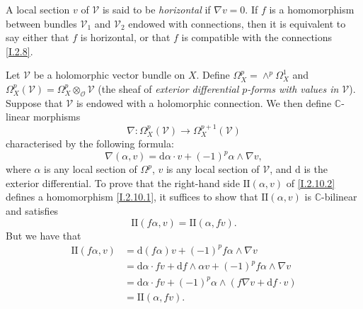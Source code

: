 \documentclass{report}
\theoremstyle{plain}
\theoremstyle{definition}
\newenvironment{env}[1]
    {\renewcommand\theinnercustomenv{#1}\innercustomenv}
    {\endinnercustomenv}
\newcommand{\sh}[1]{{\mathscr{#1}}}
\newcommand{\CC}{\mathbb{C}}
\newcommand{\dd}{\mathrm{d}}
\newcommand{\II}{\mathrm{II}}
\begin{document}
\begin{env}{2.9}
\label{I.2.9}
  A local section $v$ of $\sh{V}$ is said to be \emph{horizontal} if $\nabla v=0$.
  If $f$ is a homomorphism between bundles $\sh{V}_1$ and $\sh{V}_2$ endowed with connections, then it is equivalent to say either that $f$ is horizontal, or that $f$ is compatible with the connections \cref{I.2.8}.
\end{env}

\begin{env}{2.10}
\label{I.2.10}
  Let $\sh{V}$ be a holomorphic vector bundle on $X$.
  Define $\Omega_X^p=\wedge^p\Omega_X^1$ and $\Omega_X^p(\sh{V})=\Omega_X^p\otimes_\sh{O}\sh{V}$ (the sheaf of \emph{exterior differential $p$-forms with values in $\sh{V}$}).
  Suppose that $\sh{V}$ is endowed with a holomorphic connection.
  We then define $\CC$-linear morphisms
  \[
  \label{I.2.10.1}
    \nabla\colon \Omega_X^p(\sh{V}) \to \Omega_X^{p+1}(\sh{V})
  \tag{2.10.1}
  \]
  characterised by the following formula:
  \[
  \label{I.2.10.2}
    \nabla(\alpha,v) = \dd\alpha\cdot v + (-1)^p\alpha\wedge\nabla v,
  \tag{2.10.2}
  \]
  where $\alpha$ is any local section of $\Omega^p$, $v$ is any local section of $\sh{V}$, and $\dd$ is the exterior differential.
  To prove that the right-hand side $\II(\alpha,v)$ of \cref{I.2.10.2} defines a homomorphism \cref{I.2.10.1}, it suffices to show that $\II(\alpha,v)$ is $\CC$-bilinear and satisfies
  \[
    \II(f\alpha,v) = \II(\alpha,fv).
  \]
  But we have that
  \[
    \begin{aligned}
      \II(f\alpha,v)
      &= \dd(f\alpha)v + (-1)^pf\alpha\wedge\nabla v
    \\&= \dd\alpha\cdot fv + \dd f\wedge\alpha v + (-1)^pf\alpha\wedge\nabla v
    \\&= \dd\alpha\cdot fv + (-1)^p\alpha\wedge(f\nabla v+\dd f\cdot v)
    \\&= \II(\alpha,fv).
    \end{aligned}
  \]


\end{env}
\end{document}
